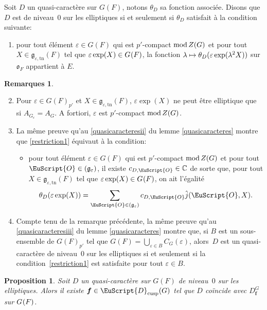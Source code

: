 \documentclass[JEP,XML,SOM,Unicode,francais]{cedram}
\let\mathcal \EuScript
\newcommand{\NoChangel}[1]{%
\expandafter\let\csname old\string#1\endcsname=#1
\let#1=\relax
\newcommand{#1}{\mathcode`l="716C\csname old\string#1\endcsname\mathcode`l="7160 }%
}
\let\epsilon\varepsilon
\newcommand\mto{\mathchoice{\longmapsto}{\mapsto}{\mapsto}{\mapsto}}
\newcommand{\rmod}{\textup{mod}\,}
\newcommand{\frg}{\mathfrak{g}}
\newcommand{\fro}{\mathfrak{o}}
\newcommand{\cusp}{\mathrm{cusp}}
\newcommand{\rell}{\mathrm{ell}} \NoChangel{\rell}
\newcommand{\Nil}{\mathrm{Nil}} \NoChangel{\Nil}
\newcommand{\tn}{\mathrm{tn}}
\newcommand{\bmf}{\boldsymbol{f}}
\newcommand{\cD}{\mathcal{D}}
\newcommand{\cO}{\mathcal{O}}
\newcommand{\CC}{\mathbb{C}}
\theoremstyle{plain}
\newtheorem*{prop*}{Proposition}
\theoremstyle{definition}
\newtheorem*{rems*}{Remarques}
\begin{document}
Soit $D$ un quasi-caractère sur $G(F)$, notons $\theta_{D}$ sa fonction associée. Disons que $D$ est de niveau~$0$ sur les elliptiques si et seulement si $\theta_{D}$ satisfait à la condition suivante:
\begin{enumerate}
\item\label{restriction1}
pour tout élément $\epsilon\!\in\!G(F)$ qui est $p'$-compact $\rmod Z(G)$ et pour tout $X\!\in\!\frg_{\epsilon,\tn}(F)$ tel que $\epsilon \exp(X)\in G_{\rell}(F)$, la fonction $\lambda\mto \theta_{D}(\epsilon \exp(\lambda^2X))$ sur $\fro_{F}$ appartient à $E$.
\end{enumerate}

\skpt
\begin{rems*}
\begin{enumerate}\setcounter{enumi}{1}
\item\label{restriction2}
Pour $\epsilon\!\in\!G(F)_{p'}$ et $X\!\in\!\frg_{\epsilon,\tn}(F)$, $\epsilon \exp(X)$ ne peut être elliptique que si $A_{G_{\epsilon}}\!=\!A_{G}$. A fortiori, $\epsilon$ est $p'$-compact $\rmod Z(G)$.

\item\label{restriction3}
La même preuve qu'au \eqref{quasicaracteresii} du lemme \ref{quasicaracteres} montre que \eqref{restriction1} équivaut à la condition:
\begin{itemize}
\item
pour tout élément $\epsilon\in G(F)$ qui est $p'$-compact $\rmod Z(G)$ et pour tout $\cO\in \Nil(\frg_{\epsilon})$, il existe $c_{D,\cO}\in \CC$ de sorte que, pour tout $X\in \frg_{\epsilon,\tn}(F)$ tel que $\epsilon \exp(X)\in G_{\rell}(F)$, on ait l'égalité
\[
\theta_{D}(\epsilon \exp(X))=\sum_{\cO\in \Nil(\frg_{\epsilon})}c_{D,\cO}\hat{j}(\cO,X).
\]
\end{itemize}

\item\label{restriction4}
Compte tenu de la remarque précédente, la même preuve qu'au \eqref{quasicaracteresiii} du lemme \ref{quasicaracteres} montre que, si $B$ est un sous-ensemble de $G(F)_{p'}$ tel que $G(F)=\bigcup_{\epsilon\in B} C_{G}(\epsilon)$, alors~$D$ est un quasi-caractère de niveau~$0$ sur les elliptiques si et seulement si la condition~\eqref{restriction1} est satisfaite pour tout $\epsilon\in B$.
\end{enumerate}
\end{rems*}

\begin{prop*}
Soit $D$ un quasi-caractère sur $G(F)$ de niveau~$0$ sur les elliptiques. Alors il existe $\bmf\in \cD_{\cusp}(G)$ tel que $D$ coïncide avec $D^G_{\bmf}$ sur $G_{\rell}(F)$.
\end{prop*}
\end{document}
